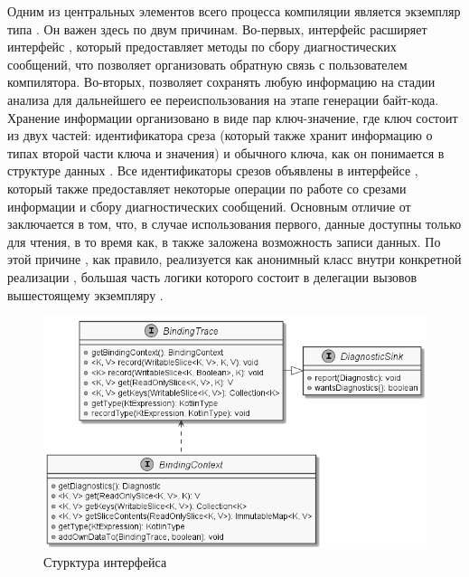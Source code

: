  Одним из центральных элементов всего процесса компиляции является экземпляр типа . Он важен здесь по двум причинам. Во-первых, интерфейс  расширяет интерфейс , который предоставляет методы по сбору диагностических сообщений, что позволяет организовать обратную связь с пользователем компилятора. Во-вторых,  позволяет сохранять любую информацию на стадии анализа для дальнейшего ее переиспользования на этапе генерации байт-кода. Хранение информации организовано в виде пар ключ-значение, где ключ состоит из двух частей: идентификатора среза (который также хранит информацию о типах второй части ключа и значения) и обычного ключа, как он понимается в структуре данных . Все идентификаторы срезов объявлены в интерфейсе , который также предоставляет некоторые операции по работе со срезами информации и сбору диагностических сообщений. Основным отличие  от  заключается в том, что, в случае использования первого, данные доступны только для чтения, в то время как, в  также заложена возможность записи данных. По этой причине , как правило, реализуется как анонимный класс внутри конкретной реализации , большая часть логики которого состоит в делегации вызовов вышестоящему экземпляру .   

\begin{figure}[htbp]
    \centering
    \includegraphics[width=\textwidth]{resources/06/04_binding_context.png}
    \caption{Стурктура интерфейса }
    \label{fig05:binding-trace-scheme}
\end{figure}

